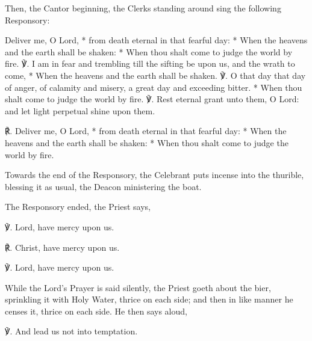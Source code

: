 \begin{rubric}
    Then, the Cantor beginning, the Clerks standing around sing the following Responsory:
\end{rubric}\par\noindent
Deliver me, O Lord, * from death eternal in that fearful day: * When the heavens and the earth shall be shaken: * When thou shalt come to judge the world by fire. ℣. I am in fear and trembling till the sifting be upon us, and the wrath to come, * When the heavens and the earth shall be shaken. ℣. O that day that day of anger, of calamity and misery, a great day and exceeding bitter. * When thou shalt come to judge the world by fire. ℣. Rest eternal grant unto them, O Lord: and let light perpetual shine upon them.\par
℟. Deliver me, O Lord, * from death eternal in that fearful day: * When the heavens and the earth shall be shaken: * When thou shalt come to judge the world by fire.

\begin{rubric}
    Towards the end of the Responsory, the Celebrant puts incense into the thurible, blessing it as usual, the Deacon ministering the boat.
\end{rubric}
\begin{rubric}
	The Responsory ended, the Priest says,
\end{rubric}

℣. Lord, have mercy upon us.

℟. Christ, have mercy upon us.

℣. Lord, have mercy upon us.

\begin{rubric}
	While the Lord's Prayer is said silently, the Priest goeth about the bier, sprinkling it with Holy Water, thrice on each side; and then in like manner he censes it, thrice on each side. He then says aloud,
\end{rubric}
℣. And lead us not into temptation.

